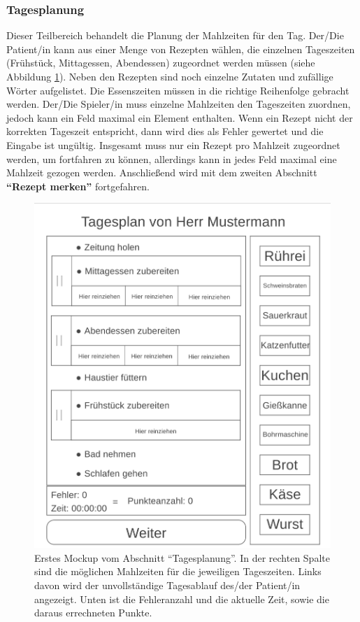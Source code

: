 \subsubsection{Tagesplanung}\label{chap:day-planning}
Dieser Teilbereich behandelt die Planung der Mahlzeiten für den Tag. Der/Die Patient/in kann aus einer Menge von Rezepten wählen, die einzelnen Tageszeiten (Frühstück, Mittagessen, Abendessen) zugeordnet werden müssen (siehe Abbildung \ref{fig:mockup-day-planning}). Neben den Rezepten sind noch einzelne Zutaten und zufällige Wörter aufgelistet. Die Essenszeiten müssen in die richtige Reihenfolge gebracht werden. Der/Die Spieler/in muss einzelne Mahlzeiten den Tageszeiten zuordnen, jedoch kann ein Feld maximal ein Element enthalten. Wenn ein Rezept nicht der korrekten Tageszeit entspricht, dann wird dies als Fehler gewertet und die Eingabe ist ungültig. Insgesamt muss nur ein Rezept pro Mahlzeit zugeordnet werden, um fortfahren zu können, allerdings kann in jedes Feld maximal eine Mahlzeit gezogen werden. Anschließend wird mit dem zweiten Abschnitt \textbf{\enquote{Rezept merken}} fortgefahren.

\begin{figure}[H]
    \centering
	\includegraphics[width=0.6\linewidth]{figures/development/mockup/day-planning.png}
	\caption{Erstes Mockup vom Abschnitt \enquote{Tagesplanung}. In der rechten Spalte sind die möglichen Mahlzeiten für die jeweiligen Tageszeiten. Links davon wird der unvollständige Tagesablauf des/der Patient/in angezeigt. Unten ist die Fehleranzahl und die aktuelle Zeit, sowie die daraus errechneten Punkte.}
	\label{fig:mockup-day-planning}
\end{figure}

